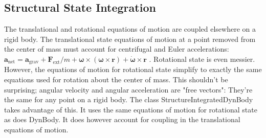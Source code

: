 \subsection{Structural State Integration}\label{sec:detailed_state_integ_struct}
The translational and rotational equations of motion are coupled elsewhere
on a rigid body. The translational state equations of motion at a point removed
from the center of mass must account for centrifugal and Euler accelerations:
$\boldsymbol a_\text{net} =
\boldsymbol a_\text{grav} + \boldsymbol F_\text{ext}/m
+ \boldsymbol{\omega} \times (\boldsymbol{\omega} \times \boldsymbol r)
+ \dot{\boldsymbol \omega} \times \boldsymbol r$ .
Rotational state is even messier. However, the equations of motion for rotational
state simplify to exactly the same equations used for rotation about the center
of mass. This shouldn't be surprising; angular velocity and angular acceleration
are "free vectors": They're the same for any point on a rigid body.
The class StructureIntegratedDynBody takes advantage of this. It uses the
same equations of motion for rotational state as does DynBody.
It does however account for coupling in the translational equations of motion.

